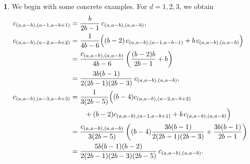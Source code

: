 \documentclass{mathincs}
\numberwithin{equation}{section}
\numberwithin{figure}{section}
\theoremstyle{plain}
\theoremstyle{definition}
\theoremstyle{remark}
\theoremstyle{plain}
\theoremstyle{definition}
\newtheorem{example}[thm]{\protect\examplename}
\theoremstyle{plain}
\theoremstyle{plain}
\providecommand{\examplename}{Example}
\begin{document}
\begin{example}\label{ex:twoparts}
We begin with some concrete examples.  For $d=1,2,3$, we obtain
\allowdisplaybreaks
\begin{align*}
  c_{(a,a-b),(a-1,a-b+1)} &=
    \frac{b}{2b-1}\,c_{(a,a-b),(a,a-b)}, \\
  c_{(a,a-b),(a-2,a-b+2)} &=
    \frac{1}{4b-6}\Bigl((b-2)\,c_{(a,a-b),(a-1,a-b-1)}+b\,c_{(a,a-b),(a,a-b)}\Bigr) \\
  &= \frac{c_{(a,a-b),(a,a-b)}}{4b-6}\left(\frac{(b-2)b}{2b-1}+b\right) \\
  &= \frac{3b(b-1)}{2(2b-1)(2b-3)}\,c_{(a,a-b),(a,a-b)}, \\
  c_{(a,a-b),(a-3,a-b+3)} &=
    \frac{1}{3(2b-5)}\Bigl((b-4)c_{(a,a-b),(a-2,a-b+2)} \\
    &\qquad +(b-2)c_{(a,a-b),(a-1,a-b+1)}+b\, c_{(a,a-b),(a,a-b)}\Bigr)\\
  &= \frac{c_{(a,a-b),(a,a-b)}}{3(2b-5)}
    \left((b-4)\frac{3b(b-1)}{2(2b-1)(2b-3)}+\frac{3b(b-1)}{2b-1}\right)\\
  &= \frac{5b(b-1)(b-2)}{2(2b-1)(2b-3)(2b-5)}\,c_{(a,a-b),(a,a-b)}.
\end{align*}
\end{example}
\end{document}
